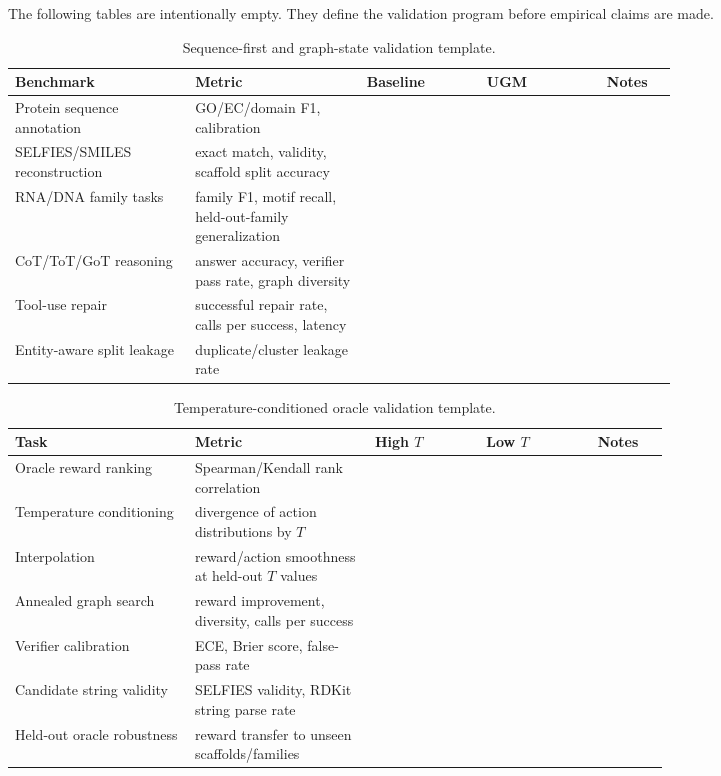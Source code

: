 \documentclass[11pt]{article}
\newcommand{\1}{\mathbf{1}}
\newcommand{\UGM}{\textsc{UGM}}
\begin{document}
The following tables are intentionally empty. They define the validation program before empirical claims are made.

\begin{table}[H]
\centering
\caption{Sequence-first and graph-state validation template.}
\scriptsize
\setlength{\tabcolsep}{3pt}
\begin{tabular}{p{0.21\linewidth}p{0.20\linewidth}p{0.14\linewidth}p{0.14\linewidth}p{0.08\linewidth}}
\toprule
Benchmark & Metric & Baseline & \UGM & Notes \\
\midrule
Protein sequence annotation & GO/EC/domain F1, calibration & & & \\
SELFIES/SMILES reconstruction & exact match, validity, scaffold split accuracy & & & \\
RNA/DNA family tasks & family F1, motif recall, held-out-family generalization & & & \\
CoT/ToT/GoT reasoning & answer accuracy, verifier pass rate, graph diversity & & & \\
Tool-use repair & successful repair rate, calls per success, latency & & & \\
Entity-aware split leakage & duplicate/cluster leakage rate & & & \\
\bottomrule
\end{tabular}
\end{table}

\begin{table}[H]
\centering
\caption{Temperature-conditioned oracle validation template.}
\scriptsize
\setlength{\tabcolsep}{3pt}
\begin{tabular}{p{0.21\linewidth}p{0.21\linewidth}p{0.13\linewidth}p{0.13\linewidth}p{0.08\linewidth}}
\toprule
Task & Metric & High \(T\) & Low \(T\) & Notes \\
\midrule
Oracle reward ranking & Spearman/Kendall rank correlation & & & \\
Temperature conditioning & divergence of action distributions by \(T\) & & & \\
Interpolation & reward/action smoothness at held-out \(T\) values & & & \\
Annealed graph search & reward improvement, diversity, calls per success & & & \\
Verifier calibration & ECE, Brier score, false-pass rate & & & \\
Candidate string validity & SELFIES validity, RDKit string parse rate & & & \\
Held-out oracle robustness & reward transfer to unseen scaffolds/families & & & \\
\bottomrule
\end{tabular}
\end{table}
\end{document}
